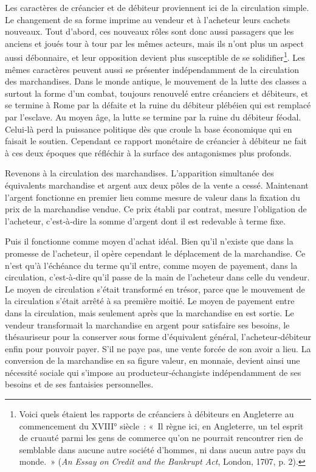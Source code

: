 \documentclass[french,twoside]{book} %
\begin{document}
Les caractères de créancier et de débiteur proviennent ici de la circulation simple. Le changement de sa forme imprime au vendeur et à l’acheteur leurs cachets nouveaux. Tout d’abord, ces nouveaux rôles sont donc aussi passagers que les anciens et joués tour à tour par les mêmes acteurs, mais ils n’ont plus un aspect aussi débonnaire, et leur opposition devient plus susceptible de se solidifier\footnote{Voici quels étaient les rapports de créanciers à débiteurs en Angleterre au commencement du XVIII° siècle : « Il règne ici, en Angleterre, un tel esprit de cruauté parmi les gens de commerce qu’on ne pourrait rencontrer rien de semblable dans aucune autre société d’hommes, ni dans aucun autre pays du monde. » (\emph{An Essay on Credit and the Bankrupt Act}, London, 1707, p. 2).}. Les mêmes caractères peuvent aussi se présenter indépendamment de la circulation des marchandises. Dans le monde antique, le mouvement de la lutte des classes a surtout la forme d’un combat, toujours renouvelé entre créanciers et débiteurs, et se termine à Rome par la défaite et la ruine du débiteur plébéien qui est remplacé par l’esclave. Au moyen âge, la lutte se termine par la ruine du débiteur féodal. Celui‑là perd la puissance politique dès que croule la base économique qui en faisait le soutien. Cependant ce rapport monétaire de créancier à débiteur ne fait à ces deux époques que réfléchir à la surface des antagonismes plus profonds.\par
Revenons à la circulation des marchandises. L’apparition simultanée des équivalents marchandise et argent aux deux pôles de la vente a cessé. Maintenant l’argent fonctionne en premier lieu comme mesure de valeur dans la fixation du prix de la marchandise vendue. Ce prix établi par contrat, mesure l’obligation de l’acheteur, c’est‑à‑dire la somme d’argent dont il est redevable à terme fixe.\par
Puis il fonctionne comme moyen d’achat idéal. Bien qu’il n’existe que dans la promesse de l’acheteur, il opère cependant le déplacement de la marchandise. Ce n’est qu’à l’échéance du terme qu’il entre, comme moyen de payement, dans la circulation, c’est‑à‑dire qu’il passe de la main de l’acheteur dans celle du vendeur. Le moyen de circulation s’était transformé en trésor, parce que le mouvement de la circulation s’était arrêté à sa première moitié. Le moyen de payement entre dans la circulation, mais seulement après que la marchandise en est sortie. Le vendeur transformait la marchandise en argent pour satisfaire ses besoins, le thésauriseur pour la conserver sous forme d’équivalent général, l’acheteur‑débiteur enfin pour pouvoir payer. S’il ne paye pas, une vente forcée de son avoir a lieu. La conversion de la marchandise en sa figure valeur, en monnaie, devient ainsi une nécessité sociale qui s’impose au producteur‑échangiste indépendamment de ses besoins et de ses fantaisies personnelles.\par
\end{document}
